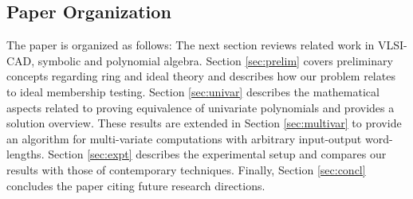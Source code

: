 \subsection {Paper Organization} 
The paper is organized as follows: The next section reviews related
work in VLSI-CAD, symbolic and polynomial algebra. Section
\ref{sec:prelim} covers preliminary concepts regarding ring and ideal
theory and describes how our problem relates to ideal membership
testing. Section \ref{sec:univar} describes the mathematical aspects
related to proving equivalence of univariate polynomials and provides
a solution overview.  These results are extended in Section
\ref{sec:multivar} to provide an algorithm for multi-variate
computations with arbitrary input-output word-lengths. Section
\ref{sec:expt} describes the experimental setup and compares our
results with those of contemporary techniques. Finally, Section
\ref{sec:concl} concludes the paper citing future research directions.

